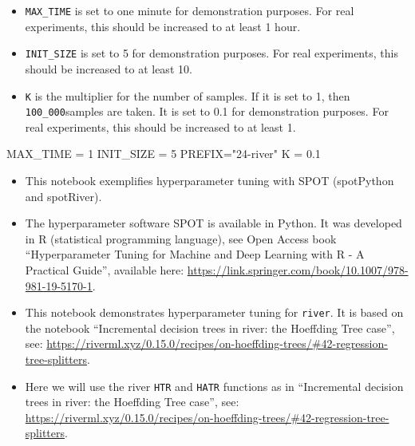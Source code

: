 \documentclass[
  letterpaper,
  DIV=11,
  numbers=noendperiod]{scrreprt}
\newenvironment{Shaded}{\begin{snugshade}}{\end{snugshade}}
\newcommand{\DecValTok}[1]{\textcolor[rgb]{0.68,0.00,0.00}{#1}}
\newcommand{\FloatTok}[1]{\textcolor[rgb]{0.68,0.00,0.00}{#1}}
\newcommand{\NormalTok}[1]{\textcolor[rgb]{0.00,0.23,0.31}{#1}}
\newcommand{\OperatorTok}[1]{\textcolor[rgb]{0.37,0.37,0.37}{#1}}
\newcommand{\StringTok}[1]{\textcolor[rgb]{0.13,0.47,0.30}{#1}}
\providecommand{\tightlist}{%
  \setlength{\itemsep}{0pt}\setlength{\parskip}{0pt}}\usepackage{longtable,booktabs,array}
\begin{document}
\begin{tcolorbox}[enhanced jigsaw, coltitle=black, bottomrule=.15mm, breakable, toprule=.15mm, colframe=quarto-callout-caution-color-frame, title=\textcolor{quarto-callout-caution-color}{\faFire}\hspace{0.5em}{Caution: Run time and initial design size should be increased for real
experiments}, colbacktitle=quarto-callout-caution-color!10!white, opacityback=0, left=2mm, leftrule=.75mm, colback=white, rightrule=.15mm, bottomtitle=1mm, toptitle=1mm, titlerule=0mm, arc=.35mm, opacitybacktitle=0.6]

\begin{itemize}
\tightlist
\item
  \texttt{MAX\_TIME} is set to one minute for demonstration purposes.
  For real experiments, this should be increased to at least 1 hour.
\item
  \texttt{INIT\_SIZE} is set to 5 for demonstration purposes. For real
  experiments, this should be increased to at least 10.
\item
  \texttt{K} is the multiplier for the number of samples. If it is set
  to 1, then \texttt{100\_000}samples are taken. It is set to 0.1 for
  demonstration purposes. For real experiments, this should be increased
  to at least 1.
\end{itemize}

\end{tcolorbox}

\begin{Shaded}
\begin{Highlighting}[]
\NormalTok{MAX\_TIME }\OperatorTok{=} \DecValTok{1}
\NormalTok{INIT\_SIZE }\OperatorTok{=} \DecValTok{5}
\NormalTok{PREFIX}\OperatorTok{=}\StringTok{"24{-}river"}
\NormalTok{K }\OperatorTok{=} \FloatTok{0.1}
\end{Highlighting}
\end{Shaded}

\begin{itemize}
\tightlist
\item
  This notebook exemplifies hyperparameter tuning with SPOT (spotPython
  and spotRiver).
\item
  The hyperparameter software SPOT is available in Python. It was
  developed in R (statistical programming language), see Open Access
  book ``Hyperparameter Tuning for Machine and Deep Learning with R - A
  Practical Guide'', available here:
  \url{https://link.springer.com/book/10.1007/978-981-19-5170-1}.
\item
  This notebook demonstrates hyperparameter tuning for \texttt{river}.
  It is based on the notebook ``Incremental decision trees in river: the
  Hoeffding Tree case'', see:
  \url{https://riverml.xyz/0.15.0/recipes/on-hoeffding-trees/\#42-regression-tree-splitters}.
\item
  Here we will use the river \texttt{HTR} and \texttt{HATR} functions as
  in ``Incremental decision trees in river: the Hoeffding Tree case'',
  see:
  \url{https://riverml.xyz/0.15.0/recipes/on-hoeffding-trees/\#42-regression-tree-splitters}.
\end{itemize}
\end{document}
